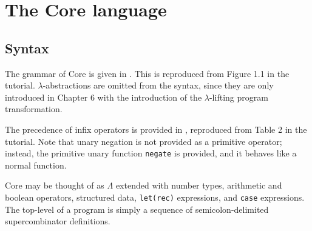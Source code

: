 \section{The Core language}
\label{sec:core}

\subsection{Syntax}
\label{sec:syntax}

The grammar of Core is given in . This is reproduced from Figure 1.1 in the tutorial. $\lambda$-abstractions are omitted from the syntax, since they are only introduced in Chapter 6 with the introduction of the $\lambda$-lifting program transformation.

The precedence of infix operators is provided in , reproduced from Table 2 in the tutorial. Note that unary negation is not provided as a primitive operator; instead, the primitive unary function \texttt{negate} is provided, and it behaves like a normal function.

Core may be thought of as $\Lambda$ extended with number types, arithmetic and boolean operators, structured data, \texttt{let(rec)} expressions, and \texttt{case} expressions. The top-level of a program is simply a sequence of semicolon-delimited supercombinator definitions.

